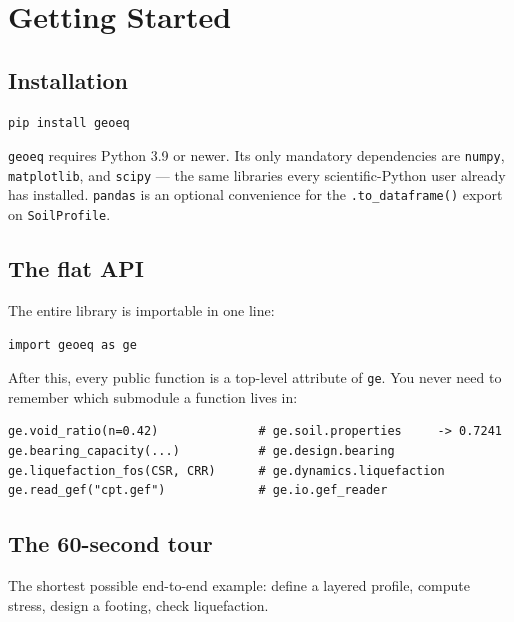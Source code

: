 \documentclass[11pt,a4paper,openany]{book}
\newcommand{\geo}{\texttt{geoeq}}
\newcommand{\code}[1]{\texttt{#1}}
\begin{document}
\mainmatter

\chapter{Getting Started}\label{ch:start}

\section{Installation}

\begin{lstlisting}
pip install geoeq
\end{lstlisting}

\geo{} requires Python 3.9 or newer. Its only mandatory
dependencies are \texttt{numpy}, \texttt{matplotlib}, and
\texttt{scipy} --- the same libraries every scientific-Python
user already has installed. \texttt{pandas} is an optional
convenience for the \texttt{.to\_dataframe()} export on
\texttt{SoilProfile}.

\section{The flat API}

The entire library is importable in one line:
\begin{lstlisting}
import geoeq as ge
\end{lstlisting}

After this, every public function is a top-level attribute of
\code{ge}. You never need to remember which submodule a function
lives in:
\begin{lstlisting}
ge.void_ratio(n=0.42)              # ge.soil.properties     -> 0.7241
ge.bearing_capacity(...)           # ge.design.bearing
ge.liquefaction_fos(CSR, CRR)      # ge.dynamics.liquefaction
ge.read_gef("cpt.gef")             # ge.io.gef_reader
\end{lstlisting}

\section{The 60-second tour}

The shortest possible end-to-end example: define a layered
profile, compute stress, design a footing, check liquefaction.
\end{document}
